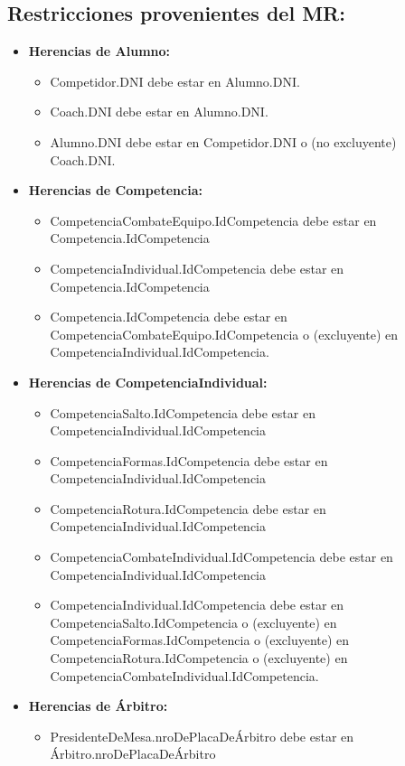 \subsection{Restricciones provenientes del MR:}
\begin{itemize}
\item \textbf{Herencias de Alumno:}
\begin{itemize}
\item Competidor.DNI debe estar en Alumno.DNI.
\item Coach.DNI debe estar en Alumno.DNI.
\item Alumno.DNI debe estar en Competidor.DNI o (no excluyente) Coach.DNI.
\end{itemize}
\item \textbf{Herencias de Competencia:}
\begin{itemize}
\item CompetenciaCombateEquipo.IdCompetencia debe estar en Competencia.IdCompetencia
\item CompetenciaIndividual.IdCompetencia debe estar en Competencia.IdCompetencia
\item Competencia.IdCompetencia debe estar en CompetenciaCombateEquipo.IdCompetencia o (excluyente) en CompetenciaIndividual.IdCompetencia.
\end{itemize}
\item \textbf{Herencias de CompetenciaIndividual:}
\begin{itemize}
\item CompetenciaSalto.IdCompetencia debe estar en CompetenciaIndividual.IdCompetencia
\item CompetenciaFormas.IdCompetencia debe estar en CompetenciaIndividual.IdCompetencia
\item CompetenciaRotura.IdCompetencia debe estar en CompetenciaIndividual.IdCompetencia
\item CompetenciaCombateIndividual.IdCompetencia debe estar en CompetenciaIndividual.IdCompetencia
\item CompetenciaIndividual.IdCompetencia debe estar en CompetenciaSalto.IdCompetencia o (excluyente) en CompetenciaFormas.IdCompetencia o (excluyente) en CompetenciaRotura.IdCompetencia o (excluyente) en CompetenciaCombateIndividual.IdCompetencia.
\end{itemize}
\item \textbf{Herencias de Árbitro:}
\begin{itemize}
\item PresidenteDeMesa.nroDePlacaDeÁrbitro debe estar en Árbitro.nroDePlacaDeÁrbitro

\end{itemize}
\end{itemize}
